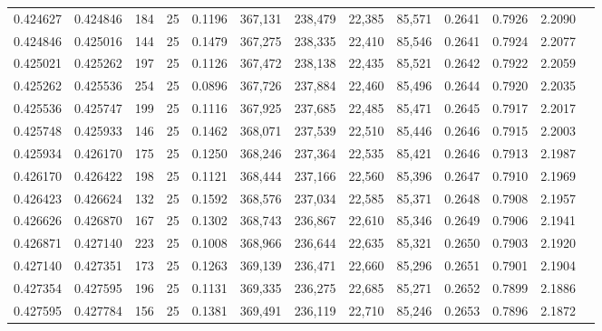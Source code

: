 \begin{tabular}{rrrrrrrrrrrrr}
0.424627 & 0.424846 &   184 &  25 &                                     0.1196 & 367,131 & 238,479 &  22,385 &  85,571 & 0.2641 & 0.7926 & 2.2090 \\
0.424846 & 0.425016 &   144 &  25 &                                     0.1479 & 367,275 & 238,335 &  22,410 &  85,546 & 0.2641 & 0.7924 & 2.2077 \\
0.425021 & 0.425262 &   197 &  25 &                                     0.1126 & 367,472 & 238,138 &  22,435 &  85,521 & 0.2642 & 0.7922 & 2.2059 \\
0.425262 & 0.425536 &   254 &  25 &                                     0.0896 & 367,726 & 237,884 &  22,460 &  85,496 & 0.2644 & 0.7920 & 2.2035 \\
0.425536 & 0.425747 &   199 &  25 &                                     0.1116 & 367,925 & 237,685 &  22,485 &  85,471 & 0.2645 & 0.7917 & 2.2017 \\
0.425748 & 0.425933 &   146 &  25 &                                     0.1462 & 368,071 & 237,539 &  22,510 &  85,446 & 0.2646 & 0.7915 & 2.2003 \\
0.425934 & 0.426170 &   175 &  25 &                                     0.1250 & 368,246 & 237,364 &  22,535 &  85,421 & 0.2646 & 0.7913 & 2.1987 \\
0.426170 & 0.426422 &   198 &  25 &                                     0.1121 & 368,444 & 237,166 &  22,560 &  85,396 & 0.2647 & 0.7910 & 2.1969 \\
0.426423 & 0.426624 &   132 &  25 &                                     0.1592 & 368,576 & 237,034 &  22,585 &  85,371 & 0.2648 & 0.7908 & 2.1957 \\
0.426626 & 0.426870 &   167 &  25 &                                     0.1302 & 368,743 & 236,867 &  22,610 &  85,346 & 0.2649 & 0.7906 & 2.1941 \\
0.426871 & 0.427140 &   223 &  25 &                                     0.1008 & 368,966 & 236,644 &  22,635 &  85,321 & 0.2650 & 0.7903 & 2.1920 \\
0.427140 & 0.427351 &   173 &  25 &                                     0.1263 & 369,139 & 236,471 &  22,660 &  85,296 & 0.2651 & 0.7901 & 2.1904 \\
0.427354 & 0.427595 &   196 &  25 &                                     0.1131 & 369,335 & 236,275 &  22,685 &  85,271 & 0.2652 & 0.7899 & 2.1886 \\
0.427595 & 0.427784 &   156 &  25 &                                     0.1381 & 369,491 & 236,119 &  22,710 &  85,246 & 0.2653 & 0.7896 & 2.1872 \\

\end{tabular}
